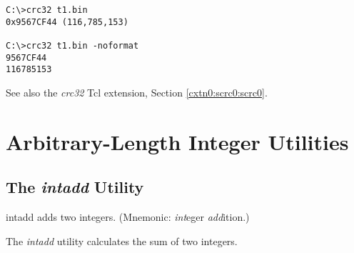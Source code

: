 \begin{dosutilcommandsampleinvocations}
\begin{scriptsize}
\begin{verbatim}
C:\>crc32 t1.bin
0x9567CF44 (116,785,153)

C:\>crc32 t1.bin -noformat
9567CF44
116785153
\end{verbatim}
\end{scriptsize}
\end{dosutilcommandsampleinvocations}

\begin{dosutilcommandseealso}
See also the \emph{crc32} Tcl extension, 
Section \cxtnzeroxrefhyphen{}\ref{cxtn0:scrc0:scrc0}.
\end{dosutilcommandseealso}


\section{Arbitrary-Length Integer Utilities}
\label{cdcm0:sali0}


\subsection{The \emph{intadd} Utility}
\label{cdcm0:sali0:sadd0}

\begin{dosutilcommandname}{intadd}%
adds two integers.  (Mnemonic:  \emph{int}eger
\emph{add}ition.)
\end{dosutilcommandname}

\begin{dosutilcommandsynopsis}
\end{dosutilcommandsynopsis}

\begin{dosutilcommanddescription}
The \emph{intadd} utility calculates the sum of two integers.
\end{dosutilcommanddescription}


